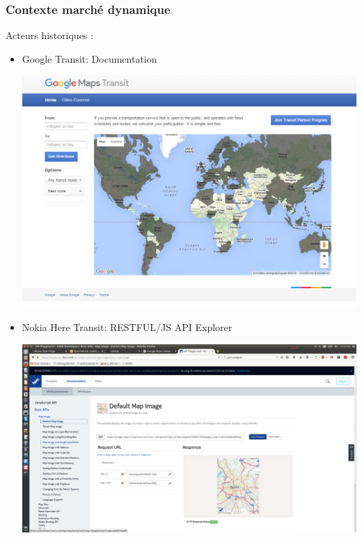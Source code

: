 \documentclass[table]{beamer}
\begin{document}
\begin{frame}
  \frametitle{Contexte marché dynamique}
  \begin{description}
    \item[Acteurs historiques : ]
  \end{description}
  \begin{itemize}
    \item Google Transit: Documentation
    \begin{center}
      \includegraphics[height=0.4\textheight]{images/google_transit}
    \end{center}
    \item Nokia Here Transit: RESTFUL/JS API Explorer
    \begin{center}
      \includegraphics[height=0.25\textheight]{images/Here-API-Explorer}
    \end{center}
    
  \end{itemize}
\end{frame}
\end{document}
